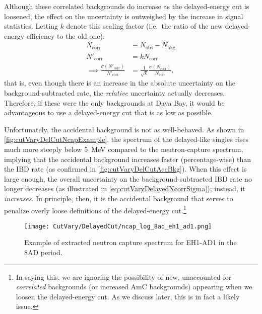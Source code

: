 \documentclass[../thesis.tex]{subfiles}
\begin{document}
Although these correlated backgrounds do increase as the delayed-energy cut is loosened, the effect on the uncertainty is outweighed by the increase in signal statistics. Letting $k$ denote this scaling factor (i.e.\ the ratio of the new delayed-energy efficiency to the old one):
\begin{align}
  \label{eq:cutVaryDelayedNcorrSigma}
  N_{\mathrm{corr}} &\equiv N_{\mathrm{obs}} - N_{\mathrm{bkg}} \\
  N'_{\mathrm{corr}} &= k N_{\mathrm{corr}} \\
  \implies \frac{\sigma(N'_{\mathrm{corr}})}{N'_{\mathrm{corr}}} &= \frac{1}{\sqrt{k}} \frac{\sigma(N_{\mathrm{corr}})}{N_{\mathrm{corr}}},
\end{align}
that is, even though there is an increase in the absolute uncertainty on the background-subtracted rate, the \emph{relative} uncertainty actually decreases. Therefore, if these were the only backgrounds at Daya Bay, it would be advantageous to use a delayed-energy cut that is as low as possible.

Unfortunately, the accidental background is not as well-behaved. As shown in \autoref{fig:cutVaryDelCutNcapExample}, the spectrum of the delayed-like singles rises much more steeply below 5~MeV compared to the neutron-capture spectrum, implying that the accidental background increases faster (percentage-wise) than the IBD rate (as confirmed in \autoref{fig:cutVaryDelCutAccBkg}). When this effect is large enough, the overall uncertainty on the background-subtracted IBD rate no longer decreases (as illustrated in \autoref{eq:cutVaryDelayedNcorrSigma}); instead, it \emph{increases}. In principle, then, it is the accidental background that serves to penalize overly loose definitions of the delayed-energy cut.\footnote{In saying this, we are ignoring the possibility of new, unaccounted-for \emph{correlated} backgrounds (or increased AmC backgrounds) appearing when we loosen the delayed-energy cut. As we discuss later, this is in fact a likely issue.}

\begin{figure}[ht]
  \texttt{[image: CutVary/DelayedCut/ncap\_log\_8ad\_eh1\_ad1.png]}
  \caption{Example of extracted neutron capture spectrum for EH1-AD1 in the 8AD period.}
  \label{fig:cutVaryDelCutNcapExample}
\end{figure}

\end{document}
